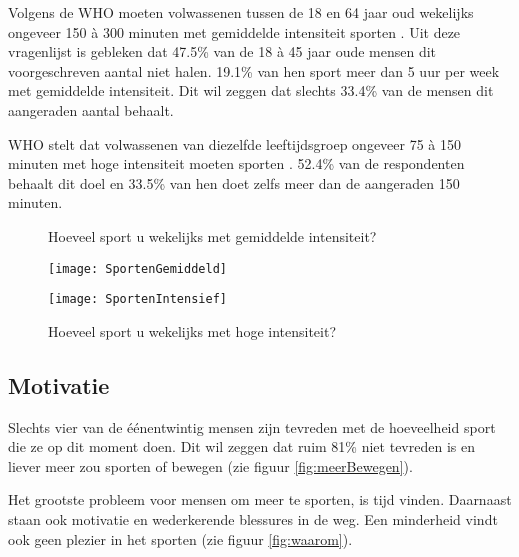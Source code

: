 Volgens de WHO moeten volwassenen tussen de 18 en 64 jaar oud wekelijks ongeveer 150 à 300 minuten met gemiddelde intensiteit sporten \autocite{Bull2020}.
Uit deze vragenlijst is gebleken dat 47.5\% van de 18 à 45 jaar oude mensen dit voorgeschreven aantal niet halen. 19.1\% van hen sport meer dan 5 uur per week met gemiddelde intensiteit. Dit wil zeggen dat slechts 33.4\% van de mensen dit aangeraden aantal behaalt.

WHO stelt dat volwassenen van diezelfde leeftijdsgroep ongeveer 75 à 150 minuten met hoge intensiteit moeten sporten \autocite{Bull2020}.
52.4\% van de respondenten behaalt dit doel en 33.5\% van hen doet zelfs meer dan de aangeraden 150 minuten.

\begin{figure}[htbp]
    \begin{minipage}[t]{0.48\linewidth} %
        \centering
        \caption[Hoeveel sport u wekelijks met gemiddelde intensiteit?]{Hoeveel sport u wekelijks met gemiddelde intensiteit?}
        \texttt{[image: SportenGemiddeld]}
        \label{fig:gemiddeldSporten}
    \end{minipage}
    \hfill
    \begin{minipage}[t]{0.48\linewidth} %
        \centering
        \caption[Hoeveel sport u wekelijks met hoge intensiteit?]{Hoeveel sport u wekelijks met hoge intensiteit?}
        \texttt{[image: SportenIntensief]}
        \label{fig:intensiefSporten}
    \end{minipage}
\end{figure}

\subsection{Motivatie}

Slechts vier van de éénentwintig mensen zijn tevreden met de hoeveelheid sport die ze op dit moment doen. Dit wil zeggen dat ruim 81\% niet tevreden is en liever meer zou sporten of bewegen (zie figuur \ref{fig:meerBewegen}).

Het grootste probleem voor mensen om meer te sporten, is tijd vinden. Daarnaast staan ook motivatie en wederkerende blessures in de weg. Een minderheid vindt ook geen plezier in het sporten (zie figuur \ref{fig:waarom}).

